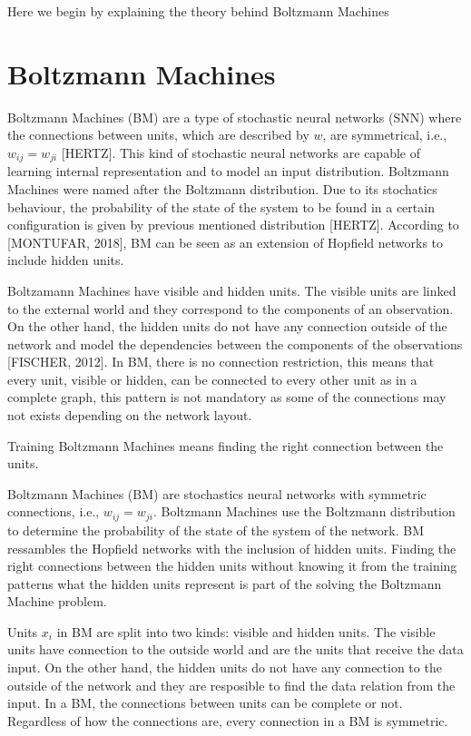 Here we begin by explaining the theory behind Boltzmann Machines

\section{Boltzmann Machines}

Boltzmann Machines (BM) are a type of stochastic neural networks (SNN) where the connections between units, which are described by $w$, are symmetrical, i.e., $w_{ij} = w_{ji}$ [HERTZ]. This kind of stochastic neural networks are capable of learning internal representation and to model an input distribution. Boltzmann Machines were named after the Boltzmann distribution. Due to its stochatics behaviour, the probability of the state of the system to be found in a certain configuration is given by previous mentioned distribution [HERTZ]. According to [MONTUFAR, 2018], BM can be seen as an extension of Hopfield networks to include hidden units.


Boltzamann Machines have visible and hidden units. The visible units are linked to the external world and they correspond to the components of an observation. On the other hand, the hidden units do not have any connection outside of the network and model the dependencies between the components of the observations [FISCHER, 2012]. In BM, there is no connection restriction, this means that every unit, visible or hidden, can be connected to every other unit as in a complete graph, this pattern is not mandatory as some of the connections may not exists depending on the network layout.

Training Boltzmann Machines means finding the right connection between the units.


Boltzmann Machines (BM) are stochastics neural networks with symmetric connections, i.e., $w_{ij} = w_{ji}$. Boltzmann Machines use the Boltzmann distribution to determine the probability of the state of the system of the network. BM ressambles the Hopfield networks with the inclusion of hidden units. Finding the right connections between the hidden units without knowing it from the training patterns what the hidden units represent is part of the solving the Boltzmann Machine problem.

Units $x_{i}$ in BM are split into two kinds: visible and hidden units. The visible units have connection to the outside world and are the units that receive the data input. On the other hand, the hidden units do not have any connection to the outside of the network and they are resposible to find the data relation from the input. In a BM, the connections between units can be complete or not. Regardless of how the connections are, every connection in a BM is symmetric.

